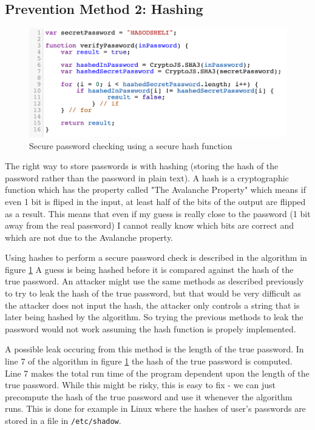 \subsection{Prevention Method 2: Hashing}
\begin{figure}[H]
    
    \includegraphics[scale=0.6]{images/chapter_1/password_check_algo_3.png}
    \caption{Secure password checking using a secure hash function}
    \label{c1_fig_pass_check_3}
\end{figure}

The right way to store passwords is with hashing (storing the hash of the
password rather than the password in plain text). A hash is a cryptographic
function which has the property called "The Avalanche Property" which means if
even 1 bit is fliped in the input, at least half of the bits of the output are
flipped as a result. This means that even if my guess is really close to the
password (1 bit away from the real password) I cannot really know which bits are
correct and which are not due to the Avalanche property.

Using hashes to perform a secure password check is described in the algorithm in
figure \ref{c1_fig_pass_check_3} A guess is being hashed before it is compared
against the hash of the true password. An attacker might use the same methods
as described previously to try to leak the hash of the true password, but that would be very
difficult as the attacker does not input the hash, the attacker only controls a
string that is later being hashed by the algorithm. So trying the previous methods
to leak the password would not work assuming the hash function is propely
implemented. 

A possible leak occuring from this method is the length of the true
password. In line 7 of the algorithm in figure \ref{c1_fig_pass_check_3} the
hash of the true password is computed. Line 7 makes the total run time of the
program dependent upon the length of the true password. While this might be risky,
this is easy to fix - we can just precompute the hash of the true password and
use it whenever the algorithm runs. This is done for example in Linux where the
hashes of user's passwords are stored in a file in \lstinline{/etc/shadow}.



